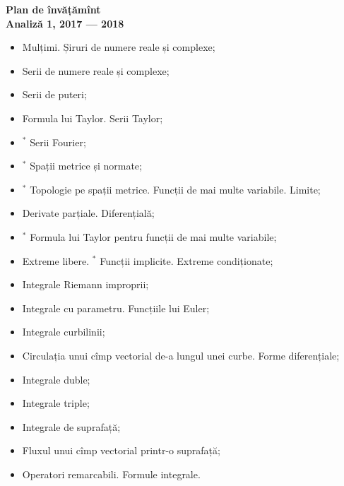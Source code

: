 \documentclass[a4paper,11pt]{article}
\begin{document}
\begin{center}
  {\Large\textbf{Plan de învățămînt \\ Analiză 1, 2017 --- 2018}}
\end{center}
\vspace{1cm}

\begin{itemize}
  \item Mulțimi. Șiruri de numere reale și complexe;
  \item Serii de numere reale și complexe;
  \item Serii de puteri;
  \item Formula lui Taylor. Serii Taylor;
  \item ${}^\ast$ Serii Fourier;
  \item ${}^\ast$ Spații metrice și normate;
  \item ${}^\ast$ Topologie pe spații metrice. Funcții de mai multe variabile. Limite;
  \item Derivate parțiale. Diferențială;
  \item ${}^\ast$ Formula lui Taylor pentru funcții de mai multe variabile;
  \item Extreme libere. ${}^\ast$ Funcții implicite. Extreme condiționate;
  \item Integrale Riemann improprii;
  \item Integrale cu parametru. Funcțiile lui Euler;
  \item Integrale curbilinii;
  \item Circulația unui cîmp vectorial de-a lungul unei curbe. Forme diferențiale;
  \item Integrale duble;
  \item Integrale triple;
  \item Integrale de suprafață;
  \item Fluxul unui cîmp vectorial printr-o suprafață;
  \item Operatori remarcabili. Formule integrale.
\end{itemize}
\end{document}
